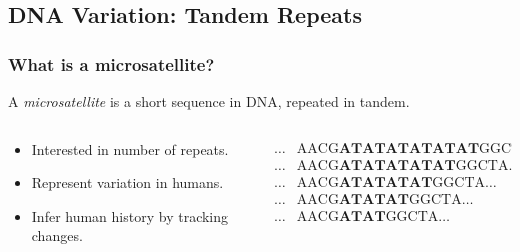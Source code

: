 \documentclass[11pt]{beamer}
\begin{document}
	\subsection{DNA Variation: Tandem Repeats}\label{subsec:dvtr}
    \begin{frame}
        \frametitle{What is a microsatellite?}
        \begin{definition}[Microsatellite]
            A \emph{microsatellite} is a short sequence in DNA, repeated in tandem.
        \end{definition} \bigskip

        \begin{columns}
            \begin{column}{0.4\textwidth}
                \begin{itemize}
                    \item Interested in number of repeats.
                    \item Represent variation in humans.
                    \item Infer human history by tracking changes.
                \end{itemize}
            \end{column}
            \begin{column}{0.6\textwidth}
                \begin{equation*}
                    \begin{aligned}
                         \ldots &\text{AACG}\textbf{ATATATATATAT}\text{GGCTA} \ldots \\
                         \ldots &\text{AACG}\textbf{ATATATATAT}\text{GGCTA} \ldots \\
                         \ldots &\text{AACG}\textbf{ATATATAT}\text{GGCTA} \ldots \\
                         \ldots &\text{AACG}\textbf{ATATAT}\text{GGCTA} \ldots \\
                         \ldots &\text{AACG}\textbf{ATAT}\text{GGCTA} \ldots
                    \end{aligned}
                \end{equation*}
            \end{column}
        \end{columns}


\end{frame}
\end{document}
